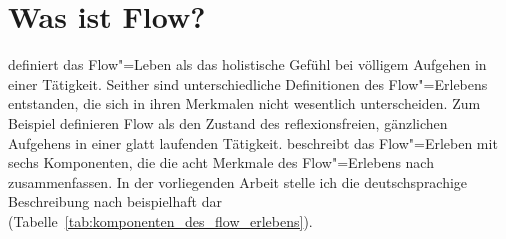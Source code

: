 

\section{Was ist Flow?} 

\label{sec:was_ist_flow}

\citet[S.~58f.]{Csikszentmihalyi2010} definiert das Flow"=Leben als das holistische Gefühl bei völligem Aufgehen in einer Tätigkeit. Seither sind unterschiedliche Definitionen des Flow"=Erlebens entstanden, die sich in ihren Merkmalen nicht wesentlich unterscheiden. Zum Beispiel definieren \citet[][S.~263]{Rheinberg2003} Flow als den Zustand des reflexionsfreien, gänzlichen Aufgehens in einer glatt laufenden Tätigkeit. \citet[S.~153ff.]{Rheinberg2008} beschreibt das Flow"=Erleben mit sechs Komponenten, die die acht Merkmale des Flow"=Erlebens nach \citet[S.~108ff.]{Csikszentmihalyi2010} zusammenfassen. In der vorliegenden Arbeit stelle ich die deutschsprachige Beschreibung nach \citet[]{Rheinberg2008} beispielhaft dar (Tabelle~\ref{tab:komponenten_des_flow_erlebens}). 
